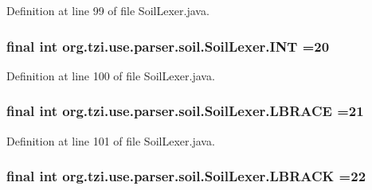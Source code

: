 Definition at line 99 of file Soil\-Lexer.\-java.

\hypertarget{classorg_1_1tzi_1_1use_1_1parser_1_1soil_1_1_soil_lexer_ae9d425b1182703c77b2efbcc0a45ec2e}{
\subsubsection[{I\-N\-T}]{\setlength{\rightskip}{0pt plus 5cm}final int org.\-tzi.\-use.\-parser.\-soil.\-Soil\-Lexer.\-I\-N\-T =20\hspace{0.3cm}{\ttfamily [static]}}}\label{classorg_1_1tzi_1_1use_1_1parser_1_1soil_1_1_soil_lexer_ae9d425b1182703c77b2efbcc0a45ec2e}


Definition at line 100 of file Soil\-Lexer.\-java.

\hypertarget{classorg_1_1tzi_1_1use_1_1parser_1_1soil_1_1_soil_lexer_ac95c4629e81847beaaea6df4a0b7999a}{
\subsubsection[{L\-B\-R\-A\-C\-E}]{\setlength{\rightskip}{0pt plus 5cm}final int org.\-tzi.\-use.\-parser.\-soil.\-Soil\-Lexer.\-L\-B\-R\-A\-C\-E =21\hspace{0.3cm}{\ttfamily [static]}}}\label{classorg_1_1tzi_1_1use_1_1parser_1_1soil_1_1_soil_lexer_ac95c4629e81847beaaea6df4a0b7999a}


Definition at line 101 of file Soil\-Lexer.\-java.

\hypertarget{classorg_1_1tzi_1_1use_1_1parser_1_1soil_1_1_soil_lexer_a2cadaad657bc8a27d97e440b33176af3}{
\subsubsection[{L\-B\-R\-A\-C\-K}]{\setlength{\rightskip}{0pt plus 5cm}final int org.\-tzi.\-use.\-parser.\-soil.\-Soil\-Lexer.\-L\-B\-R\-A\-C\-K =22\hspace{0.3cm}{\ttfamily [static]}}}\label{classorg_1_1tzi_1_1use_1_1parser_1_1soil_1_1_soil_lexer_a2cadaad657bc8a27d97e440b33176af3}


